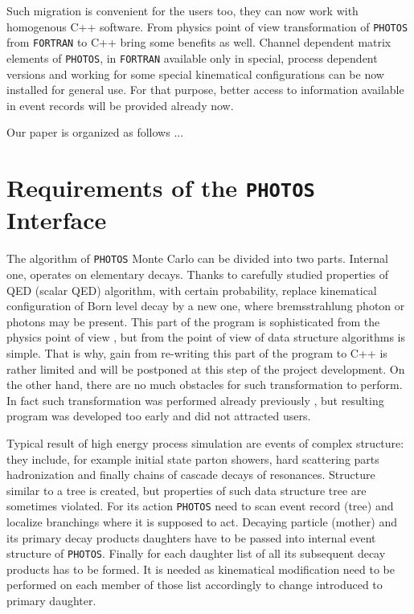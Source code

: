 \documentclass[]{Photos_interface_design}
\begin{document}
Such migration is convenient for the users too,  they can now work
with  homogenous C++ software. From physics point of view transformation 
of {\tt PHOTOS} 
from {\tt FORTRAN} to C++  bring some benefits as well.
Channel dependent matrix elements of {\tt PHOTOS}, in {\tt FORTRAN} available only 
in special, process dependent versions and working for some special
kinematical configurations
can be now installed for general use.
For that purpose, better access to information available in event records
will be provided already now.



Our paper is organized as follows ...



\section{Requirements of the {\tt PHOTOS} Interface}
The algorithm of {\tt PHOTOS} Monte Carlo can be divided into two parts.
Internal one, operates on elementary decays. Thanks to carefully 
studied properties of 
QED (scalar QED) algorithm, with certain probability, 
replace  kinematical configuration of Born level decay by a new one, 
where bremsstrahlung photon or photons
may be present. This part of the program is sophisticated from the physics 
point of view \cite{Nanava:2006vv,Golonka:2006tw},
but from the point of view of data structure algorithms is simple.
That is why, gain from re-writing this part of the program to C++ is rather
limited and will be postponed at this step of the project development.
On the other hand, there are no much obstacles for such transformation to 
perform. In fact such transformation was performed already
previously \cite{photosplus}, but resulting program was developed too early 
and did not attracted users.

Typical result of high energy process simulation are events of complex structure:
they include, for example initial state parton showers, hard scattering parts 
hadronization and finally chains of cascade decays of resonances. 
Structure similar to a tree is created, but properties of such data structure
tree are sometimes violated.
For its action {\tt PHOTOS} need to scan event record (tree) 
and localize branchings where
it is supposed to act. Decaying particle (mother) and its primary decay products
daughters have to be passed into internal event structure of {\tt PHOTOS}. 
Finally for each daughter list of all its subsequent decay products has to be 
formed. It is needed as kinematical modification need to be performed on each 
member of those list accordingly to change introduced to primary daughter.
\end{document}
